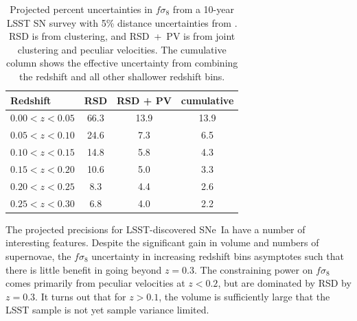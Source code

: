 \documentclass{aastex62}   	%
\begin{document}
\begin{table}
   \centering
   \begin{tabular}{@{} lccc @{}} %
	\hline
	Redshift & RSD & RSD + PV & cumulative\\ \hline
      $0.00<z<0.05$   & 66.3 & 13.9 & 13.9\\
     $0.05<z<0.10$            & 24.6     &  7.3 & 6.5\\
     $0.10<z<0.15$      & 14.8  & 5.8 & 4.3\\
     $0.15<z<0.20$      & 10.6  & 5.0 & 3.3\\
      $0.20<z<0.25$     & 8.3  & 4.4 & 2.6\\
     $0.25<z<0.30$  & 6.8  &  4.0 & 2.2\\
      \hline
   \end{tabular}
   \caption{Projected percent uncertainties in $f\sigma_8$ from a 10-year LSST SN survey with 5\% distance uncertainties from
   \citet{2017ApJ...847..128H}. RSD is from clustering, and RSD~+~PV is from joint clustering and peculiar velocities.
   The cumulative column shows the effective uncertainty from combining the redshift and all other shallower redshift bins.}
   \label{tab:howlett}
\end{table}

The projected precisions for LSST-discovered SNe~Ia have a number of interesting features. 
Despite the significant gain in volume and numbers of supernovae, the $f\sigma_8$ uncertainty in increasing redshift bins asymptotes such that 
there is little benefit in going beyond
$z=0.3$.
The constraining power on  $f\sigma_8$ 
comes primarily from peculiar velocities
at $z<0.2$, but are dominated by RSD by $z=0.3$.
It turns out that for $z>0.1$, the volume is sufficiently large that the LSST sample is not yet sample variance limited.
\end{document}
